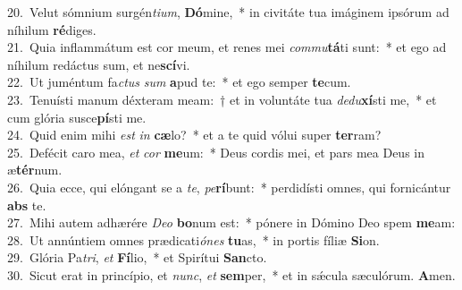 {20.~}Velut sómnium surgén\textit{ti}\textit{um}, \textbf{Dó}mine,~* in civitáte tua imáginem ipsórum ad níhilum \textbf{ré}diges.\\
{21.~}Quia inflammátum est cor meum, et renes mei \textit{com}\textit{mu}\textbf{tá}ti sunt:~* et ego ad níhilum redáctus sum, et ne\textbf{scí}vi.\\
{22.~}Ut juméntum fa\textit{ctus} \textit{sum} \textbf{a}pud te:~* et ego semper \textbf{te}cum.\\
{23.~}Tenuísti manum déxteram meam:~† et in voluntáte tua \textit{de}\textit{du}\textbf{xí}sti me,~* et cum glória susce\textbf{pí}sti me.\\
{24.~}Quid enim mihi \textit{est} \textit{in} \textbf{cæ}lo?~* et a te quid vólui super \textbf{ter}ram?\\
{25.~}Defécit caro mea, \textit{et} \textit{cor} \textbf{me}um:~* Deus cordis mei, et pars mea Deus in æ\textbf{tér}num.\\
{26.~}Quia ecce, qui elóngant se a \textit{te}, \textit{pe}\textbf{rí}bunt:~* perdidísti omnes, qui fornicántur \textbf{abs} te.\\
{27.~}Mihi autem adhærére \textit{De}\textit{o} \textbf{bo}num est:~* pónere in Dómino Deo spem \textbf{me}am:\\
{28.~}Ut annúntiem omnes prædicati\textit{ó}\textit{nes} \textbf{tu}as,~* in portis fíliæ \textbf{Si}on.\\
{29.~}Glória Pa\textit{tri}, \textit{et} \textbf{Fí}lio,~* et Spirítui \textbf{San}cto.\\
{30.~}Sicut erat in princípio, et \textit{nunc}, \textit{et} \textbf{sem}per,~* et in sǽcula sæculórum. \textbf{A}men.\\
